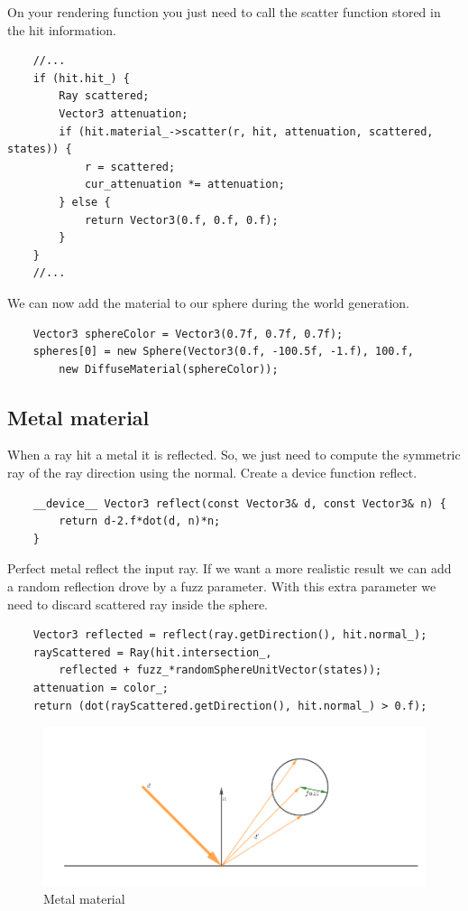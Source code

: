 \documentclass{article}
\begin{document}
On your rendering function you just need to call the scatter function stored in the hit information.
\begin{lstlisting}
	//...
	if (hit.hit_) {
		Ray scattered;
		Vector3 attenuation;
		if (hit.material_->scatter(r, hit, attenuation, scattered, states)) {
			r = scattered;
			cur_attenuation *= attenuation;
		} else {
			return Vector3(0.f, 0.f, 0.f);
		}
	}
	//...
\end{lstlisting}

We can now add the material to our sphere during the world generation.
\begin{lstlisting}
	Vector3 sphereColor = Vector3(0.7f, 0.7f, 0.7f);
	spheres[0] = new Sphere(Vector3(0.f, -100.5f, -1.f), 100.f,
		new DiffuseMaterial(sphereColor));
\end{lstlisting}

\subsection{Metal material}
When a ray hit a metal it is reflected. So, we just need to compute the symmetric ray of the ray direction using the normal. Create a device function reflect.
\begin{lstlisting}
	__device__ Vector3 reflect(const Vector3& d, const Vector3& n) {
		return d-2.f*dot(d, n)*n;
	}
\end{lstlisting}
Perfect metal reflect the input ray. If we want a more realistic result we can add a random reflection drove by a fuzz parameter. With this extra parameter we need to discard scattered ray inside the sphere.

\begin{lstlisting}
	Vector3 reflected = reflect(ray.getDirection(), hit.normal_);
	rayScattered = Ray(hit.intersection_, 
		reflected + fuzz_*randomSphereUnitVector(states));
	attenuation = color_;
	return (dot(rayScattered.getDirection(), hit.normal_) > 0.f);
\end{lstlisting}

\begin{figure}[h]
	\centering
	\includegraphics[scale=0.7]{figures/metal.png}
	\caption{Metal material}
\end{figure}
\end{document}
